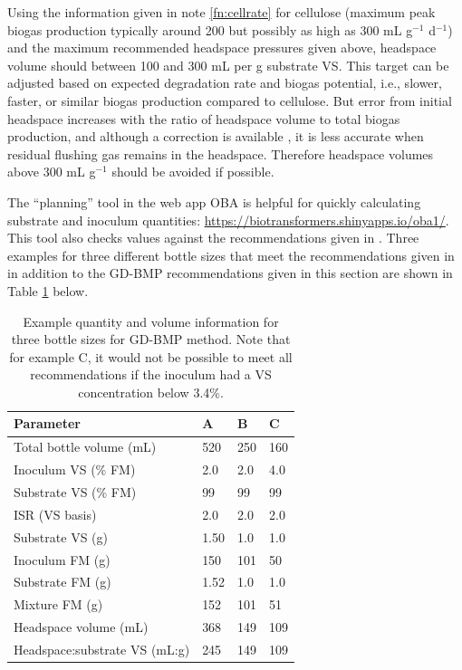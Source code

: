 \documentclass[]{article}
\begin{document}
Using the information given in note \ref{fn:cellrate} for cellulose (maximum peak biogas production typically around 200 but possibly as high as 300 mL g$^{-1}$ d$^{-1}$) and the maximum recommended headspace pressures given above, headspace volume should between 100 and 300 mL per g substrate VS.
This target can be adjusted based on expected degradation rate and biogas potential, i.e., slower, faster, or similar biogas production compared to cellulose.
But error from initial headspace increases with the ratio of headspace volume to total biogas production, and although a correction is available \citep{justesenDevelopmentValidationLowcost2019}, it is less accurate when residual flushing gas remains in the headspace.
Therefore headspace volumes above 300 mL g$^{-1}$ should be avoided if possible.

The ``planning'' tool in the web app OBA is helpful for quickly calculating substrate and inoculum quantities: \url{https://biotransformers.shinyapps.io/oba1/}.
This tool also checks values against the recommendations given in \citet{holligerStandardizationBiomethanePotential2016}.
Three examples for three different bottle sizes that meet the recommendations given in \citet{holligerStandardizationBiomethanePotential2016} in addition to the GD-BMP recommendations given in this section are shown in Table \ref{tab:examples} below.

\begin{table}[h] 
\centering
\caption{Example quantity and volume information for three bottle sizes for GD-BMP method. Note that for example C, it would not be possible to meet all recommendations if the inoculum had a VS concentration below 3.4\%.}
\label{tab:examples}
\begin{tabular}{llll}
\hline
Parameter                     & A    & B   & C   \\
\hline
Total bottle volume (mL)      & 520  & 250 & 160 \\
Inoculum VS (\% FM)           & 2.0  & 2.0 & 4.0 \\
Substrate VS (\% FM)          & 99   & 99  & 99  \\
ISR (VS basis)                & 2.0  & 2.0 & 2.0 \\
Substrate VS (g)              & 1.50 & 1.0 & 1.0 \\
Inoculum FM (g)               & 150  & 101 & 50  \\
Substrate FM (g)              & 1.52 & 1.0 & 1.0 \\
Mixture FM (g)                & 152  & 101 & 51  \\
Headspace volume (mL)         & 368  & 149 & 109 \\
Headspace:substrate VS (mL:g) & 245  & 149 & 109 \\
\hline
\end{tabular}
\end{table}
\end{document}
